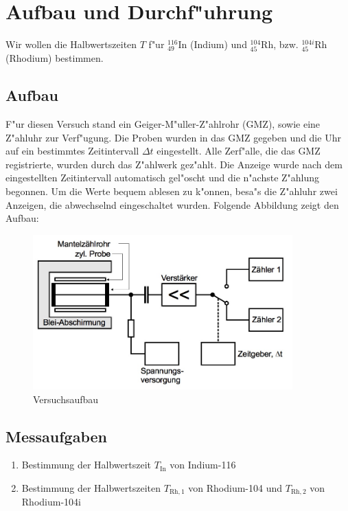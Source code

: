 \section{Aufbau und Durchf"uhrung}
	\label{sec:durchfuehrung}

	Wir wollen die Halbwertszeiten $T$ f"ur ${}_{49}^{116}\mathrm{In}$ (Indium) und ${}_{45}^{104}\mathrm{Rh}$, bzw. ${}_{45}^{104i}\mathrm{Rh}$ (Rhodium) bestimmen.

	\subsection{Aufbau}
		\label{subsec:aufbau}
		F"ur diesen Versuch stand ein Geiger-M"uller-Z"ahlrohr (GMZ), sowie eine Z"ahluhr zur Verf"ugung.
		Die Proben wurden in das GMZ gegeben und die Uhr auf ein bestimmtes Zeitintervall $\Delta t$ eingestellt.
		Alle Zerf"alle, die das GMZ registrierte, wurden durch das Z"ahlwerk gez"ahlt.
		Die Anzeige wurde nach dem eingestellten Zeitintervall automatisch gel"oscht und die n"achste Z"ahlung begonnen.
		Um die Werte bequem ablesen zu k"onnen, besa"s die Z"ahluhr zwei Anzeigen, die abwechselnd eingeschaltet wurden.
		Folgende Abbildung zeigt den Aufbau:

		\begin{figure}[!h]
			\centering
			\includegraphics[width = 10cm]{img/aufbau.jpg}
			\caption{Versuchsaufbau \cite{anleitung}}
			\label{fig:aufbau}
		\end{figure}

	\subsection{Messaufgaben}
		\label{subsec:aufgaben}
		\begin{enumerate}
			\item{Bestimmung der Halbwertszeit $T_\mathrm{In}$ von Indium-116}
			\item{Bestimmung der Halbwertszeiten $T_{\mathrm{Rh}, 1}$ von Rhodium-104 und $T_{\mathrm{Rh}, 2}$ von Rhodium-104i}
		\end{enumerate}
